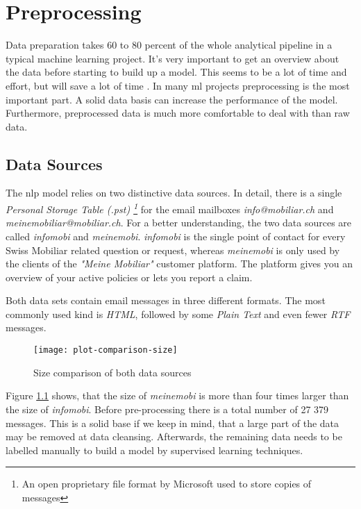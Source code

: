 \chapter{Preprocessing}

Data preparation takes 60 to 80 percent of the whole analytical pipeline in a typical machine learning project. It's very important to get an overview about the data before starting to build up a model. This seems to be a lot of time and effort, but will save a lot of time  \cite{naman18}. In many \acrlong{ml} projects preprocessing is the most important part. A solid data basis can increase the performance of the model. Furthermore, preprocessed data is much more comfortable to deal with than raw data.

\section{Data Sources}
\label{chap:data-source}

The \acrshort{nlp} model relies on two distinctive data sources. In detail, there is a single \emph{Personal Storage Table (.pst) \footnote{An open proprietary file format by Microsoft used to store copies of messages}} for the email mailboxes \emph{info@mobiliar.ch} and \emph{meinemobiliar@mobiliar.ch}. For a better understanding, the two data sources are called \emph{\gls{infomobi}} and \emph{\gls{meinemobi}}. \emph{infomobi} is the single point of contact for every Swiss Mobiliar related question or request, whereas \emph{meinemobi} is only used by the clients of the \emph{"Meine Mobiliar"} customer platform. The platform gives you an overview of your active policies or lets you report a claim.

Both data sets contain email messages in three different formats. The most commonly used kind is \emph{HTML}, followed by some \emph{Plain Text} and even fewer \emph{RTF} messages.

\begin{figure}[!ht]
    \centering
    \texttt{[image: plot-comparison-size]}
    \caption{Size comparison of both data sources}
    \label{fig:plot-comparison-size}
\end{figure}

Figure \ref{fig:plot-comparison-size} shows, that the size of \emph{meinemobi} is more than four times larger than the size of \emph{infomobi}. Before pre-processing there is a total number of 27 379 messages. This is a solid base if we keep in mind, that a large part of the data may be removed at data cleansing. Afterwards, the remaining data needs to be labelled manually to build a model by supervised learning techniques.

